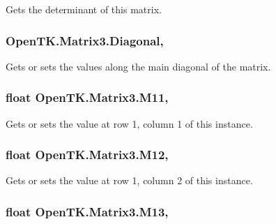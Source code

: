 Gets the determinant of this matrix. 

\hypertarget{struct_open_t_k_1_1_matrix3_a333e74e4d64af2234968fa14fdbbead9}{
\subsubsection[{Diagonal}]{ Open\-T\-K.\-Matrix3.\-Diagonal\hspace{0.3cm}{\ttfamily [get]}, {\ttfamily [set]}}}\label{struct_open_t_k_1_1_matrix3_a333e74e4d64af2234968fa14fdbbead9}


Gets or sets the values along the main diagonal of the matrix. 

\hypertarget{struct_open_t_k_1_1_matrix3_a80348732cc3e3796931427d057524684}{
\subsubsection[{M11}]{\setlength{\rightskip}{0pt plus 5cm}float Open\-T\-K.\-Matrix3.\-M11\hspace{0.3cm}{\ttfamily [get]}, {\ttfamily [set]}}}\label{struct_open_t_k_1_1_matrix3_a80348732cc3e3796931427d057524684}


Gets or sets the value at row 1, column 1 of this instance. 

\hypertarget{struct_open_t_k_1_1_matrix3_ad1f2cc65b1e98182526cfbe1dc9e5894}{
\subsubsection[{M12}]{\setlength{\rightskip}{0pt plus 5cm}float Open\-T\-K.\-Matrix3.\-M12\hspace{0.3cm}{\ttfamily [get]}, {\ttfamily [set]}}}\label{struct_open_t_k_1_1_matrix3_ad1f2cc65b1e98182526cfbe1dc9e5894}


Gets or sets the value at row 1, column 2 of this instance. 

\hypertarget{struct_open_t_k_1_1_matrix3_a99492f310f33c5f5958d43b9df9fb245}{
\subsubsection[{M13}]{\setlength{\rightskip}{0pt plus 5cm}float Open\-T\-K.\-Matrix3.\-M13\hspace{0.3cm}{\ttfamily [get]}, {\ttfamily [set]}}}\label{struct_open_t_k_1_1_matrix3_a99492f310f33c5f5958d43b9df9fb245}


